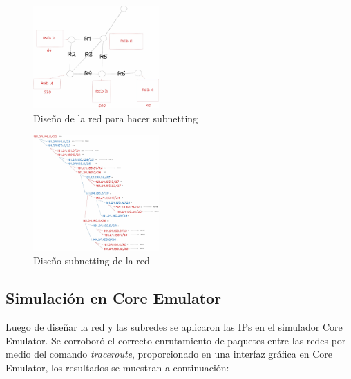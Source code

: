 \documentclass[letterpaper, 10 pt, conference]{ieeeconf}  %
\begin{document}
\begin{figure}[H]
	\centering
	\includegraphics[width=0.43\textwidth]{./Imagenes/red_subnetting_diseno.jpg}
	\caption{Diseño de la red para hacer subnetting}
\end{figure}

\begin{figure}[H]
	\centering
	\includegraphics[width=0.43\textwidth]{./Imagenes/subnetting_total.jpg}
	\caption{Diseño subnetting de la red}
\end{figure}

\subsection{Simulación en Core Emulator}

Luego de diseñar la red y las subredes se aplicaron las IPs en el simulador Core Emulator. Se corroboró el correcto enrutamiento de paquetes entre las redes por medio del comando \textit{traceroute}, proporcionado en una interfaz gráfica en Core Emulator, los resultados se muestran a continuación:
\end{document}
